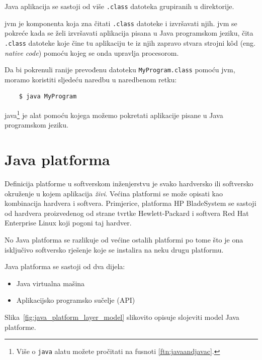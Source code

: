 \begin{infobox}
    Java aplikacija se sastoji od više \texttt{.class} datoteka grupiranih u direktorije.
\end{infobox}

\gls{jvm} je komponenta koja zna čitati \texttt{.class} datoteke i izvršavati njih. \gls{jvm} se pokreće kada se želi izvršavati aplikacija pisana u Java programskom jeziku, čita \texttt{.class} datoteke koje čine tu aplikaciju te iz njih zapravo stvara strojni kôd (eng. \emph{native code}) pomoću kojeg se onda upravlja procesorom.

Da bi pokrenuli ranije prevođenu datoteku \texttt{MyProgram.class} pomoću \gls{jvm}, moramo koristiti sljedeću naredbu u naredbenom retku:

\begin{lstlisting}
    $ java MyProgram
\end{lstlisting}

java\footnote{Više o \texttt{java} alatu možete pročitati na fusnoti \ref{ftn:javaandjavac}.} je alat pomoću kojega možemo pokretati aplikacije pisane u Java programskom jeziku.

\section{Java platforma}
\label{sec:java_platform}
Definicija platforme u softverskom inženjerstvu je svako hardversko ili softversko okruženje u kojem aplikacija \emph{živi}. Većina platformi se može opisati kao kombinacija hardvera i softvera. Primjerice, platforma HP BladeSystem se sastoji od hardvera proizvedenog od strane tvrtke Hewlett-Packard i softvera Red Hat Enterprise Linux koji pogoni taj hardver.

No Java platforma se razlikuje od većine ostalih platformi po tome što je ona isključivo softversko rješenje koje se instalira na neku drugu platformu.

Java platforma se sastoji od dva dijela:

\begin{itemize}
    \item Java virtualna mašina
    \item Aplikacijsko programsko sučelje (API)
\end{itemize}

Slika~\ref{fig:java_platform_layer_model} slikovito opisuje slojeviti model Java platforme.~\cite{javatutorials}

